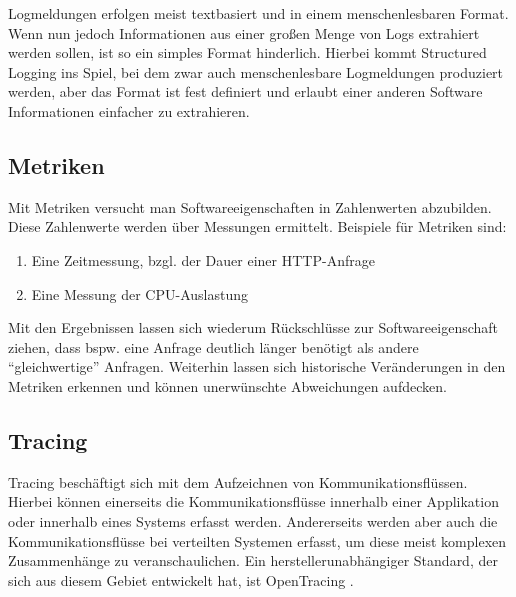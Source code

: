%

Logmeldungen erfolgen meist textbasiert und in einem menschenlesbaren Format. Wenn nun jedoch Informationen aus einer großen Menge von Logs extrahiert werden sollen, ist so ein simples Format hinderlich. Hierbei kommt Structured Logging ins Spiel, bei dem zwar auch menschenlesbare Logmeldungen produziert werden, aber das Format ist fest definiert und erlaubt einer anderen Software Informationen einfacher zu extrahieren.

\subsection{Metriken}

Mit Metriken versucht man Softwareeigenschaften in Zahlenwerten abzubilden. Diese Zahlenwerte werden über Messungen ermittelt. Beispiele für Metriken sind:

\begin{enumerate}
	\item Eine Zeitmessung, bzgl. der Dauer einer HTTP-Anfrage
	\item Eine Messung der CPU-Auslastung
\end{enumerate}

Mit den Ergebnissen lassen sich wiederum Rückschlüsse zur Softwareeigenschaft ziehen, dass bspw. eine Anfrage deutlich länger benötigt als andere \enquote{gleichwertige} Anfragen. Weiterhin lassen sich historische Veränderungen in den Metriken erkennen und können unerwünschte Abweichungen aufdecken.

\subsection{Tracing}
\label{sec:tracing}

Tracing beschäftigt sich mit dem Aufzeichnen von Kommunikationsflüssen. Hierbei können einerseits die Kommunikationsflüsse innerhalb einer Applikation oder innerhalb eines Systems erfasst werden. Andererseits werden aber auch die Kommunikationsflüsse bei verteilten Systemen erfasst, um diese meist komplexen Zusammenhänge zu veranschaulichen. Ein herstellerunabhängiger Standard, der sich aus diesem Gebiet entwickelt hat, ist OpenTracing \cite{OpenTracing}.

